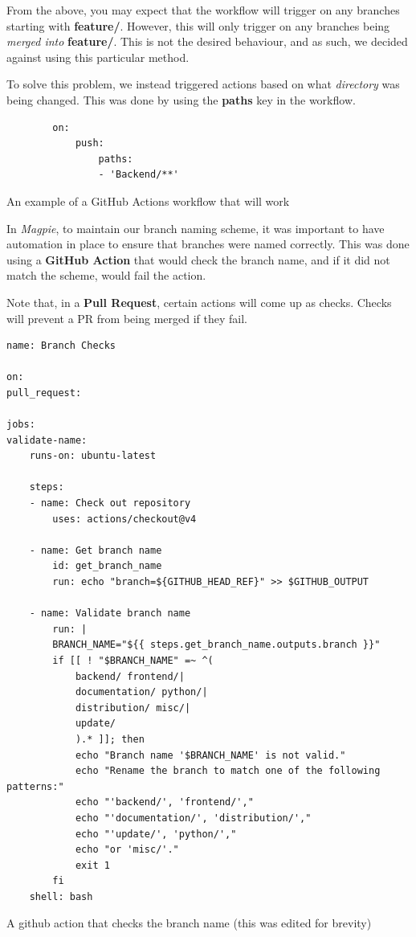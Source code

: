 From the above, you may expect that the workflow will trigger on any branches
starting with \textbf{feature/}. However, this will only trigger on any branches
being \textit{merged into} \textbf{feature/}. This is not the desired behaviour,
and as such, we decided against using this particular method.

To solve this problem, we instead triggered actions based on what \textit{directory} was
being changed. This was done by using the \textbf{paths} key in the workflow.

\begin{listing}[htbp]
    \centering{}
    \begin{minipage}{0.85\textwidth}
    \begin{verbatim}
        on:
            push:
                paths:
                - 'Backend/**'
    \end{verbatim}
    \end{minipage}
    \caption{An example of a GitHub Actions workflow that will work}
\end{listing}

\newpage{}

In \textit{Magpie}, to maintain our branch naming scheme, it was important to
have automation in place to ensure that branches were named correctly. This was
done using a \textbf{GitHub Action} that would check the branch name, and if it
did not match the scheme, would fail the action.

Note that, in a \textbf{Pull Request}, certain actions will come up as checks. 
Checks will prevent a PR from being merged if they fail.

\begin{listing}[htbp]
    \begin{verbatim}
name: Branch Checks

on:
pull_request:

jobs:
validate-name:
    runs-on: ubuntu-latest

    steps:
    - name: Check out repository
        uses: actions/checkout@v4

    - name: Get branch name
        id: get_branch_name
        run: echo "branch=${GITHUB_HEAD_REF}" >> $GITHUB_OUTPUT

    - name: Validate branch name
        run: |
        BRANCH_NAME="${{ steps.get_branch_name.outputs.branch }}"
        if [[ ! "$BRANCH_NAME" =~ ^(
            backend/ frontend/|
            documentation/ python/|
            distribution/ misc/|
            update/
            ).* ]]; then
            echo "Branch name '$BRANCH_NAME' is not valid."
            echo "Rename the branch to match one of the following patterns:"
            echo "'backend/', 'frontend/',"
            echo "'documentation/', 'distribution/',"
            echo "'update/', 'python/',"
            echo "or 'misc/'."
            exit 1
        fi
    shell: bash
    \end{verbatim}
    \caption{A github action that checks the branch name (this was edited for brevity)}
\end{listing}

